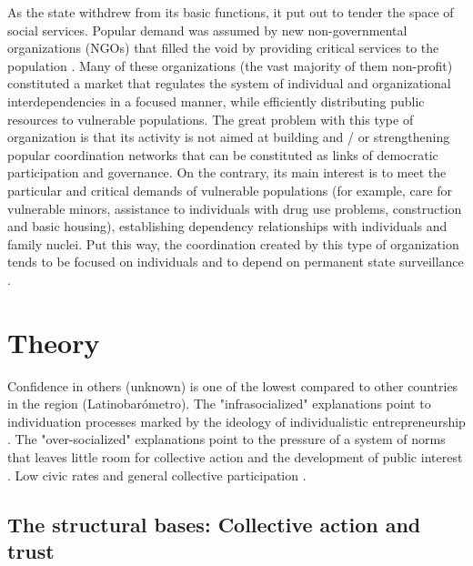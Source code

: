 As the state withdrew from its basic functions, it put out to tender the space of social services. Popular demand was assumed by new non-governmental organizations (NGOs) that filled the void by providing critical services to the population  \parencite{boulding_community_2020, holzner_poverty_2007}. Many of these organizations (the vast majority of them non-profit) constituted a market that regulates the system of individual and organizational interdependencies in a focused manner, while efficiently distributing public resources to vulnerable populations. The great problem with this type of organization is that its activity is not aimed at building and / or strengthening popular coordination networks that can be constituted as links of democratic participation and governance. On the contrary, its main interest is to meet the particular and critical demands of vulnerable populations (for example, care for vulnerable minors, assistance to individuals with drug use problems, construction and basic housing), establishing dependency relationships with individuals and family nuclei. Put this way, the coordination created by this type of organization tends to be focused on individuals and to depend on permanent state surveillance \parencite{delamaza_redes_2012}.
\bigskip


\section{Theory}

Confidence in others (unknown) is one of the lowest compared to other countries in the region (Latinobarómetro). The "infrasocialized" explanations point to individuation processes marked by the ideology of individualistic entrepreneurship \parencite{araujo_desafios_2012, yopo_individualizacion_2013}. The "over-socialized" explanations point to the pressure of a system of norms that leaves little room for collective action and the development of public interest \parencite{oxhorn_neopluralism_2004}. Low civic rates and general collective participation \parencite{espinoza_capital_2009}.

\subsection{The structural bases: Collective action and trust}

